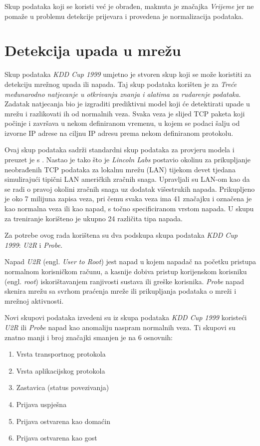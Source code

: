 \documentclass[utf8, diplomski, numeric]{fer}
\begin{document}
Skup podataka koji se koristi već je obrađen, maknuta je značajka \textit{Vrijeme} jer ne pomaže u problemu detekcije prijevara i provedena je normalizacija podataka.

\section{Detekcija upada u mrežu}
Skup podataka \textit{KDD Cup 1999} umjetno je stvoren skup koji se može koristiti za detekciju mrežnog upada ili napada. Taj skup podataka korišten je za \textit{Treće međunarodno natjecanje u otkrivanju znanja i alatima za rudarenje podataka}. Zadatak natjecanja bio je izgraditi prediktivni model koji će detektirati upade u mrežu i razlikovati ih od normalnih veza. Svaka veza je slijed TCP paketa koji počinje i završava u nekom definiranom vremenu, u kojem se podaci šalju od izvorne IP adrese na ciljnu IP adresu prema nekom definiranom protokolu.

Ovaj skup podataka sadrži standardni skup podataka za provjeru modela i preuzet je s  \cite{pang2021deep}. Nastao je tako što je \textit{Lincoln Labs} postavio okolinu za prikupljanje neobrađenih TCP podataka za lokalnu mrežu (LAN) tijekom devet tjedana simulirajući tipični LAN američkih zračnih snaga. Upravljali su LAN-om kao da se radi o pravoj okolini zračnih snaga uz dodatak višestrukih napada. Prikupljeno je oko 7 milijuna zapisa veza, pri čemu svaka veza ima 41 značajku i označena je kao normalna veza ili kao napad, s točno specificiranom vrstom napada. U skupu za treniranje korišteno je ukupno 24 različita tipa napada.

Za potrebe ovog rada korištena su dva podskupa skupa podataka \textit{KDD Cup 1999}: \textit{U2R} i \textit{Probe}.

Napad \textit{U2R} (engl. \textit{User to Root}) jest napad u kojem napadač na početku pristupa normalnom korisničkom računu, a kasnije dobiva pristup korijenskom korisniku (engl. \textit{root}) iskorištavanjem ranjivosti sustava ili greške korisnika. \textit{Probe} napad skenira mrežu sa svrhom praćenja mreže ili prikupljanja podataka o mreži i mrežnoj aktivnosti.

Novi skupovi podataka izvedeni su iz skupa podataka \textit{KDD Cup 1999} koristeći \textit{U2R} ili \textit{Probe} napad kao anomaliju naspram normalnih veza. Ti skupovi su znatno manji i broj značajki smanjen je na 6 osnovnih: 
\begin{enumerate}
\item Vrsta transportnog protokola
\item Vrsta aplikacijskog protokola
\item Zastavica (status povezivanja)
\item Prijava uspješna
\item Prijava ostvarena kao domaćin
\item Prijava ostvarena kao gost
\end{enumerate}
\end{document}
